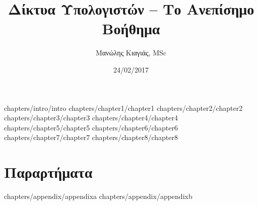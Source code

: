 \documentclass[a4paper,twoside,12pt]{book}
\author{Μανώλης Κιαγιάς, MSc}
\title{Δίκτυα Υπολογιστών -- Το Ανεπίσημο Βοήθημα}
\date{24/02/2017}
\begin{document}
\frontmatter
 {chapters/intro/intro}
\mainmatter
 {chapters/chapter1/chapter1}
 {chapters/chapter2/chapter2}
 {chapters/chapter3/chapter3}
 {chapters/chapter4/chapter4}
 {chapters/chapter5/chapter5}
 {chapters/chapter6/chapter6}
 {chapters/chapter7/chapter7}
 {chapters/chapter8/chapter8}
\part{Παραρτήματα}
\appendix
 {chapters/appendix/appendixa}
 {chapters/appendix/appendixb}
\end{document}
